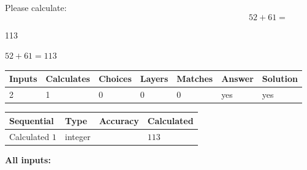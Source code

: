 \documentclass[12pt]{article}
\begin{document}
Please calculate:
\begin{equation}
52 +  %
61 = \nonumber
\end{equation}
 
 
 
\noindent{}
 
 

113
 
 
\noindent{}
 
 

 
 
 
\noindent{}
 
 

$ %
52 +  %
61=   %
113$
 
 
\noindent{}
 
 

 
   
   
   
   
\noindent\begin{tabular}{|l|l|l|l|l|l|l|}
 \hline
Inputs & Calculates & Choices & Layers & Matches & Answer & Solution \\ \hline
 2  & 
 1  & 
 0
  & 
 0  & 
 0  & 
  yes & 
  yes 
  \\ \hline
 \end{tabular}
   
   
   
   
\noindent{}
   
   
  
  
\noindent\begin{tabular}{|l|l|l|l|}
\hline
 Sequential & Type & Accuracy & Calculated \\ 
\hline
 
 
  Calculated $  1 $ & integer &  & 
  $ 113 $ 
 \\  \hline  
 \end{tabular}
   
   
   
   
\noindent\vspace{0.1in}\hspace{-0.08in} {\textbf{\Large{All inputs: }}}
   
   
  
\end{document}
